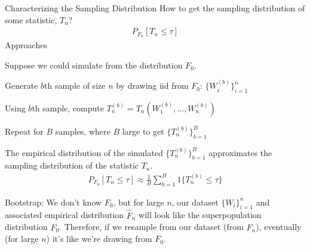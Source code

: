 \documentclass[aspectratio=169, handout]{beamer}
\begin{document}
{\footnotesize
\begin{frame}{Characterizing the Sampling Distribution}
How to get the \alert{sampling distribution} of some statistic, $T_n$?
\begin{align*}
  P_{F_0}[T_n \leq \tau]
\end{align*}
\vspace{-10pt}
Approaches
\begin{enumerate}
  {\footnotesize
  \item[3.]
    Suppose we could simulate from the distribution $F_0$.
    \begin{enumerate}
      {\footnotesize
      \item[(i)] Generate $b$th sample of size $n$
        by drawing iid from $F_0$:
        $\{W_i^{(b)}\}_{i=1}^n$
      \item[(ii)] Using $b$th sample, compute
        $T_n^{(b)}=T_n(W_1^{(b)},\ldots,W_n^{(b)})$
      \item[(iii)] Repeat for $B$ samples, where $B$ large to get
        $\{T_n^{(b)}\}_{b=1}^B$
      }
    \end{enumerate}
    The empirical distribution of the simulated $\{T_n^{(b)}\}_{b=1}^B$
    approximates the sampling distribution of the statistic $T_n$.
    \begin{align*}
      P_{F_0}[T_n \leq \tau]
      \approx
      \frac{1}{B}
      \sum_{b=1}^B
      1\{T_n^{(b)}\leq \tau\}
    \end{align*}


  \item[4.] \alert{Bootstrap}:
    We don't know $F_0$, but for large $n$, our dataset
    $\{W_i\}_{i=1}^n$ and associated empirical distribution $\hat{F}_n$
    will \alert{look like} the superpopulation distribution $F_0$.
    Therefore, if we resample from our dataset (from $\hat{F}_n$),
    eventually (for large $n$) it's like we're drawing from $F_0$.

  }
\end{enumerate}
\end{frame}
}
\end{document}
